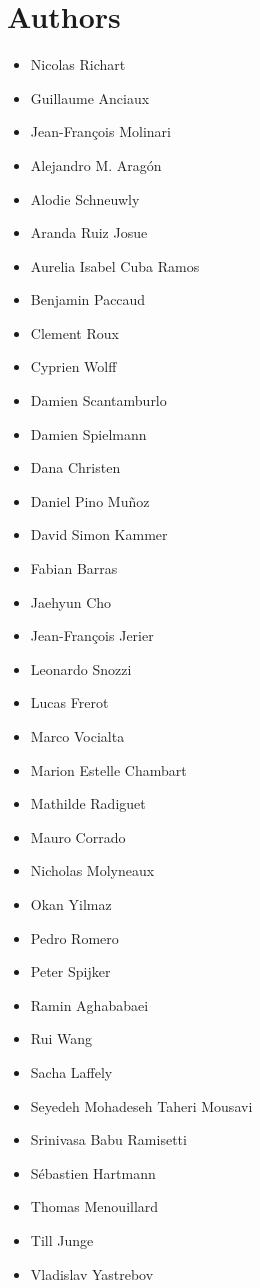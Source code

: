 \chapter*{Authors}
\begin{multicols}{2}
\begin{itemize}
  \setlength\itemsep{0ex}
\item Nicolas Richart
\item Guillaume Anciaux
\item Jean-Fran\c{c}ois Molinari
\item Alejandro M. Arag\'on
\item Alodie Schneuwly
\item Aranda Ruiz Josue
\item Aurelia Isabel Cuba Ramos
\item Benjamin Paccaud
\item Clement Roux
\item Cyprien Wolff
\item Damien Scantamburlo
\item Damien Spielmann
\item Dana Christen
\item Daniel Pino Mu\~noz
\item David Simon Kammer
\item Fabian Barras
\item Jaehyun Cho
\item Jean-Fran\c{c}ois Jerier
\item Leonardo Snozzi
\item Lucas Frerot
\item Marco Vocialta
\item Marion Estelle Chambart
\item Mathilde Radiguet
\item Mauro Corrado
\item Nicholas Molyneaux
\item Okan Yilmaz
\item Pedro Romero
\item Peter Spijker
\item Ramin Aghababaei
\item Rui Wang
\item Sacha Laffely
\item Seyedeh Mohadeseh Taheri Mousavi
\item Srinivasa Babu Ramisetti
\item S\'ebastien Hartmann
\item Thomas Menouillard
\item Till Junge
\item Vladislav Yastrebov
\end{itemize}
\end{multicols}

